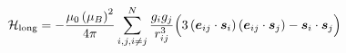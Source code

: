 \documentclass[preview]{standalone}
\begin{document}
\begin{varwidth}{50in}
  \begin{equation}
    \mathcal{H}_{\rm long}= 
    -\frac{\mu_{0} \left( \mu_B\right)^2}{4\pi} 
    \sum_{i,j,i\neq j}^{N}
    \frac{g_i g_j}{r_{ij}^3}
    \Big(3 
    \left(\bm{e}_{ij}\cdot \bm{s}_{i}\right) 
    \left(\bm{e}_{ij}\cdot \bm{s}_{j}\right) 
    -\bm{s}_i\cdot\bm{s}_j \Big)
    \nonumber
  \end{equation}
\end{varwidth}
\end{document}
